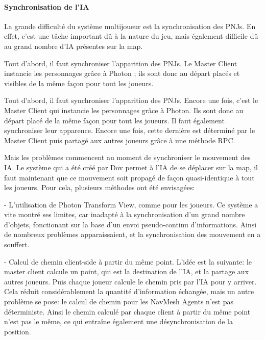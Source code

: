         \paragraph{Synchronisation de l'IA}

            La grande difficulté du système multijoueur est la synchronisation des PNJs. En effet, c'est une tâche important dû à la nature du jeu, 
            mais également difficile dû au grand nombre d'IA présentes sur la map.

            Tout d'abord, il faut synchroniser l'apparition des PNJs. Le Master Client instancie les personnages grâce à Photon ; ils sont donc au départ 
            placés et visibles de la même façon pour tout les joueurs.

            Tout d'abord, il faut synchroniser l'apparition des PNJs. Encore une fois, c'est le Master Client qui instancie les personnages
            grâce à Photon. Ils sont donc au départ placé de la même façon pour tout les joueurs. Il faut également synchroniser leur apparence.
            Encore une fois, cette dernière est déterminé par le Master Client puis partagé aux autres joueurs grâce à une méthode RPC.

            Mais les problèmes commencent au moment de synchroniser le mouvement des IA. Le système qui a été créé par Dov permet
            à l'IA de se déplacer sur la map, il faut maintenant que ce mouvement soit propagé de façon quasi-identique à tout les joueurs.
            Pour cela, plusieurs méthodes ont été envisagées:

            - L'utilisation de Photon Transform View, comme pour les joueurs. Ce système a vite montré ses limites, car inadapté à la synchronisation
            d'un grand nombre d'objets, fonctionant sur la base d'un envoi pseudo-continu d'informations. Ainsi de nombreux problèmes apparaissaient,
            et la synchronisation des mouvement en a souffert. 

            - Calcul de chemin client-side à partir du même point. L'idée est la suivante: le master client calcule un point, qui est la destination
            de l'IA, et la partage aux autres joueurs. Puis chaque joueur calcule le chemin pris par l'IA pour y arriver. Cela réduit considérablement la
            quantité d'information échangée, mais un autre problème se pose: le calcul de chemin pour les NavMesh Agents n'est pas déterministe. Ainsi le
            chemin calculé par chaque client à partir du même point n'est pas le même, ce qui entraîne également une désynchronisation de la position.

